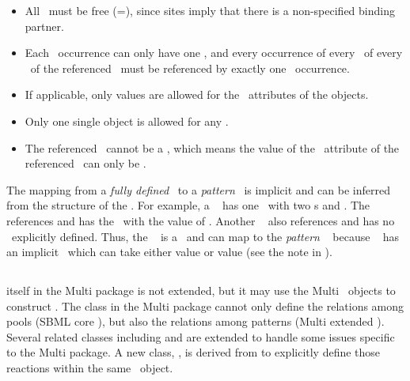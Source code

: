 \begin{itemize}
 \item All \outwardBindingSites\ must be free (\bindingStatusAtt=), since  sites imply that there is a non-specified binding partner.
 \item Each \speciesFeature\ occurrence can only have one \speciesFeatureValue, and every occurrence of every \speciesFeatureType\ of every \component\ of the referenced \speciesType\ must be referenced by exactly one \speciesFeature\  occurrence.
 \item If applicable, only  values are allowed for the \relationAtt\ attributes of the \SubListOfSpeciesFeatures objects.
 \item Only one single \SpeciesFeatureValue object is allowed for any \speciesFeature.
 \item The referenced \compartment\ cannot be a , which means the value of the \isTypeAtt\ attribute of the referenced \compartment\ can only be .
\end{itemize}

The mapping from a \emph{fully defined} \species\ to a \emph{pattern} \species\ is implicit and can be inferred from the structure of the \species. For example, a \speciesType\  has one \speciesFeatureType\ with two \possibleSpeciesFeatureValue s  and . The \species\   references  and has the \speciesFeature\ with the value of . Another \species\  also references  and has no \speciesFeature\ explicitly defined. Thus, the \species\  is a  \species\ and can map to the \emph{pattern} \species\  because \species\  has an implicit \speciesFeature\ which can take either value  or value  (see the note in ).


\clearpage

\subsection{}
\label{def:ExReaction}


 itself in the Multi package is not extended, but it may use the Multi \ExSpecies\ objects to construct \reactions. The  class in the Multi package cannot only define the relations among pools (SBML core \species), but also the relations among patterns (Multi extended \species). Several related classes including \ExSimpleSpeciesReference and \ExSpeciesReference are extended to handle some issues specific to the Multi package. A new class, \IntraSpeciesReaction, is derived from  to explicitly define those reactions within the same \ExSpecies\ object.

